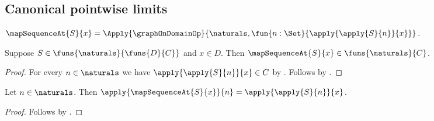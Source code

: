 \subsection{Canonical pointwise limits}

\begin{definition}\label{map_sequence_at}
    $\mapSequenceAt{S}{x}=\Apply{\graphOnDomainOp}
        {\naturals,\fun{n:\Set}{\apply{\apply{S}{n}}{x}}}$.
\end{definition}

\begin{proposition}\label{map_sequence_at_typed}
    Suppose $S\in\funs{\naturals}{\funs{D}{C}}$ and $x\in D$.
    Then $\mapSequenceAt{S}{x}\in\funs{\naturals}{C}$.
\end{proposition}
\begin{proof}
    For every $n\in\naturals$ we have
        $\apply{\apply{S}{n}}{x}\in C$
        by .
    Follows by .
\end{proof}

\begin{proposition}\label{map_sequence_at_apply}
    Let $n\in\naturals$.
    Then $\apply{\mapSequenceAt{S}{x}}{n}
        =\apply{\apply{S}{n}}{x}$.
\end{proposition}
\begin{proof}
    Follows by .
\end{proof}

